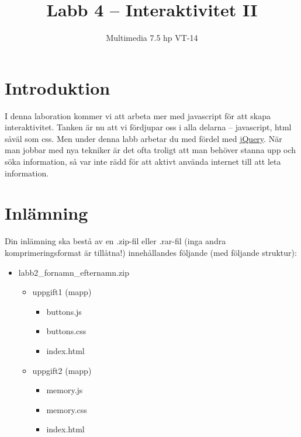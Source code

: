 \documentclass[12pt]{article}
\date{}
\title{ Labb 4 -- Interaktivitet II }
\author{ Multimedia 7.5 hp VT-14 }
\begin{document}
\maketitle
\vspace{-2em}



\section{Introduktion}
I denna laboration kommer vi att arbeta mer med javascript för att skapa interaktivitet. Tanken är nu att vi fördjupar oss i alla delarna -- javascript, html såväl som css. Men under denna labb arbetar du med fördel med \href{http://jquery.com/}{jQuery}. När man jobbar med nya tekniker är det ofta troligt att man behöver stanna upp och söka information, så var inte rädd för att aktivt använda internet till att leta information.

\section{Inlämning}
Din inlämning ska bestå av en .zip-fil eller .rar-fil (inga andra komprimeringsformat är tillåtna!) innehållandes följande (med följande struktur):
  \begin{itemize}
    \item labb2\_fornamn\_efternamn.zip

      \begin{itemize}
        \item uppgift1 (mapp)
          \begin{itemize}
            \item buttons.js
            \item buttons.css 
            \item index.html
          \end{itemize}
	      \item uppgift2 (mapp)
          \begin{itemize}
            \item memory.js
            \item memory.css
            \item index.html
          \end{itemize}
    \end{itemize}
  \end{itemize}

  
\end{document}
